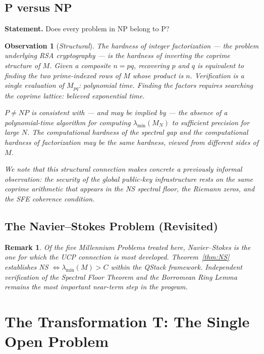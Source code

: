\documentclass[12pt]{article}
\newtheorem{observation}[theorem]{Observation}
\newtheorem{remark}[theorem]{Remark}
\begin{document}
\subsection{P versus NP}

\textbf{Statement.} Does every problem in NP belong to P?

\begin{observation}[\emph{Structural}]
\label{obs:PNP}
The hardness of integer factorization --- the problem
underlying RSA cryptography --- is the hardness of inverting
the coprime structure of $M$. Given a composite $n = pq$,
recovering $p$ and $q$ is equivalent to finding the two
prime-indexed rows of $M$ whose product is $n$. Verification
is a single evaluation of $M_{pq}$: polynomial time.
Finding the factors requires searching the coprime lattice:
believed exponential time.

$P \neq NP$ is consistent with --- and may be implied by ---
the absence of a polynomial-time algorithm for computing
$\lambda_{\min}(M_N)$ to sufficient precision for large $N$.
The computational hardness of the spectral gap and the
computational hardness of factorization may be the same
hardness, viewed from different sides of $M$.

We note that this structural connection makes concrete a
previously informal observation: the security of the
global public-key infrastructure rests on the same
coprime arithmetic that appears in the NS spectral floor,
the Riemann zeros, and the SFE coherence condition.
\end{observation}

\subsection{The Navier--Stokes Problem (Revisited)}

\begin{remark}
Of the five Millennium Problems treated here, Navier--Stokes
is the one for which the UCP connection is most developed.
Theorem~\ref{thm:NS} establishes
NS $\Leftrightarrow \lambda_{\min}(M) > C$ within the QStack
framework. Independent verification of the Spectral Floor
Theorem and the Borromean Ring Lemma remains the most
important near-term step in the program.
\end{remark}

\section{The Transformation T: The Single Open Problem}
\label{sec:T}
\end{document}
